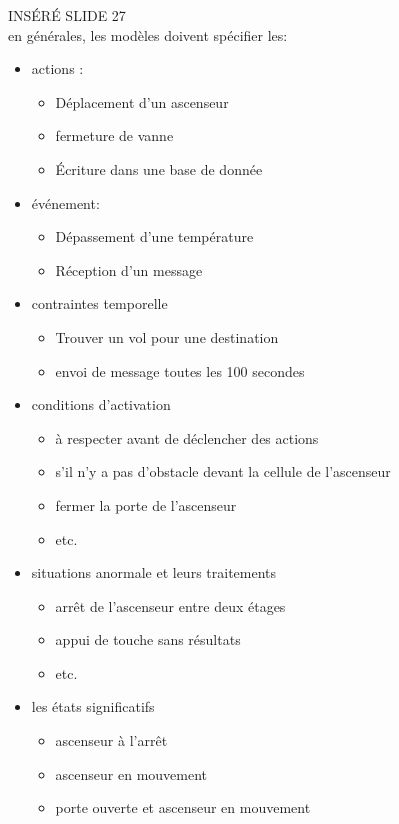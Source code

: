 \documentclass[oneside]{book}
\begin{document}
    INSÉRÉ SLIDE 27\\
    
    en générales, les modèles doivent spécifier les:
    \begin{itemize}
        \item actions :
        \begin{itemize}
        	\item Déplacement d'un ascenseur
        	\item fermeture de vanne
        	\item Écriture dans une base de donnée
        \end{itemize}
        \item événement:
        \begin{itemize}
        	\item Dépassement d'une température
        	\item Réception d'un message
        \end{itemize}
        \item contraintes temporelle
        \begin{itemize}
        	\item Trouver un vol pour une destination
        	\item envoi de message toutes les 100 secondes
        \end{itemize}
        \item conditions d'activation
        \begin{itemize}
        	\item à respecter avant de déclencher des actions
        	\item s'il n'y a pas d'obstacle devant la cellule de l'ascenseur
        	\item fermer la porte de l'ascenseur
        	\item etc.
        \end{itemize}
        \item situations anormale et leurs traitements
        \begin{itemize}
        	\item arrêt de l'ascenseur entre deux étages
        	\item appui de touche sans résultats
        	\item etc.
        \end{itemize}
        \item les états significatifs
        \begin{itemize}
        	\item ascenseur à l'arrêt
        	\item ascenseur en mouvement
        	\item porte ouverte et ascenseur en mouvement
        \end{itemize}
    \end{itemize} 
\end{document}
